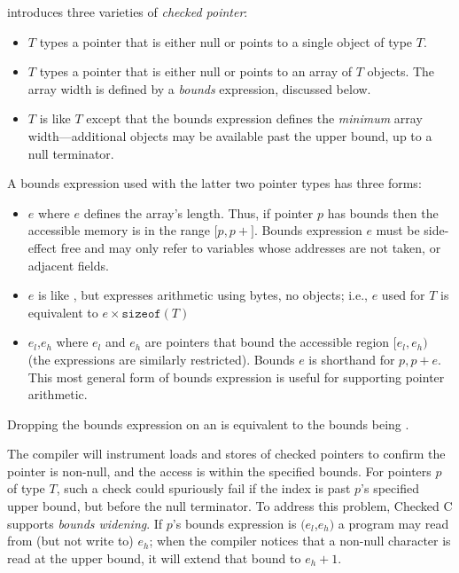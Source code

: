 \checkedc{} introduces three varieties of \emph{checked pointer}:
\begin{itemize}
\item {}$T$\code{>} types a pointer that is either null or
  points to a single object of type $T$.
\item {}$T$\code{>} types a pointer that is either null
  or points to an array of $T$ objects. The array width is defined
  by a \emph{bounds} expression, discussed below.
\item {}$T$\code{>} is like
  $T$\code{>} except that the bounds expression
  defines the \emph{minimum} array width---additional objects may
  be available past the upper bound, up to a null terminator.
\end{itemize}
A bounds expression used with the latter two pointer types has three
forms:
\begin{itemize}
\item {}$e$\code{)} where $e$ defines the array's
  length. Thus, if pointer $p$ has bounds  then the
  accessible memory is in the range $[p,p+$$]$. Bounds
  expression $e$ must be side-effect free and may only refer to
  variables whose addresses are not taken, or adjacent 
  fields.
\item {}$e$\code{)} is like , but
  expresses arithmetic using bytes, no objects; i.e.,
  $e$\code{)} used for $T$\code{>} is
  equivalent to $e\times\texttt{sizeof}(T)$\code{)}
\item {}$e_l$,$e_h$\code{)} where $e_l$ and $e_h$ are
  pointers that bound the accessible region $[e_l,e_h)$ (the
  expressions are similarly restricted). Bounds
  $e$\code{)} is shorthand for
  $p, p + e$\code{)}. This most general form of bounds
  expression is useful for supporting pointer arithmetic.
\end{itemize}
  Dropping the bounds expression on an  is equivalent
  to the bounds being .

The \checkedc compiler will instrument loads and stores of checked
pointers to confirm the pointer is non-null, and the access is within
the specified bounds. For pointers $p$ of type
$T$\code{>}, such a check could spuriously fail if
the index is past $p$'s specified upper bound, but before the null
terminator. To address this problem, Checked C supports \emph{bounds
  widening}.
If $p$'s bounds expression is $(e_l$,$e_h)$ a program may read from (but not
write to) $e_h$; when the compiler notices that a non-null character
is read at the upper bound, it will extend that bound to $e_h+1$.

